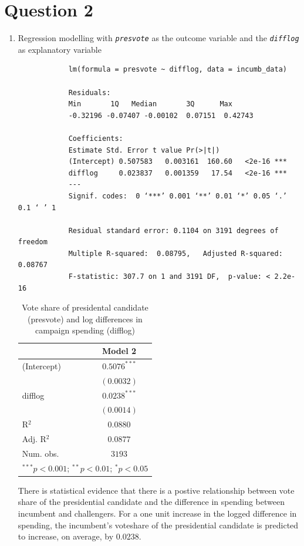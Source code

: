 \documentclass[12pt,letterpaper]{article}
\begin{document}
	\section*{Question 2}
	\begin{enumerate}
		\item Regression modelling with \textit{\texttt{presvote}} as the outcome variable and the \textit{\texttt{difflog}} as explanatory variable
		
		\begin{verbatim}
			lm(formula = presvote ~ difflog, data = incumb_data)
			
			Residuals:
			Min       1Q   Median       3Q      Max 
			-0.32196 -0.07407 -0.00102  0.07151  0.42743 
			
			Coefficients:
			Estimate Std. Error t value Pr(>|t|)    
			(Intercept) 0.507583   0.003161  160.60   <2e-16 ***
			difflog     0.023837   0.001359   17.54   <2e-16 ***
			---
			Signif. codes:  0 ‘***’ 0.001 ‘**’ 0.01 ‘*’ 0.05 ‘.’ 0.1 ‘ ’ 1
			
			Residual standard error: 0.1104 on 3191 degrees of freedom
			Multiple R-squared:  0.08795,	Adjusted R-squared:  0.08767 
			F-statistic: 307.7 on 1 and 3191 DF,  p-value: < 2.2e-16
		\end{verbatim}
		\begin{table}[H]
			\begin{center}
				\begin{tabular}{l c}
					\hline
					& Model 2 \\
					\hline
					(Intercept) & $0.5076^{***}$ \\
					& $(0.0032)$     \\
					difflog     & $0.0238^{***}$ \\
					& $(0.0014)$     \\
					\hline
					R$^2$       & $0.0880$       \\
					Adj. R$^2$  & $0.0877$       \\
					Num. obs.   & $3193$         \\
					\hline
					\multicolumn{2}{l}{\scriptsize{$^{***}p<0.001$; $^{**}p<0.01$; $^{*}p<0.05$}}
				\end{tabular}
				\caption{Vote share of presidental candidate (presvote) and log differences in campaign spending (difflog)}
				\label{table:coefficients}
			\end{center}
		\end{table}
	There is statistical evidence that there is a postive relationship between vote share of the presidential candidate and the difference in spending between incumbent and challengers. For a one unit increase in the logged difference in spending, the incumbent's voteshare of the presidential candidate is predicted to increase, on average, by 0.0238.
	

\end{enumerate}
\end{document}
